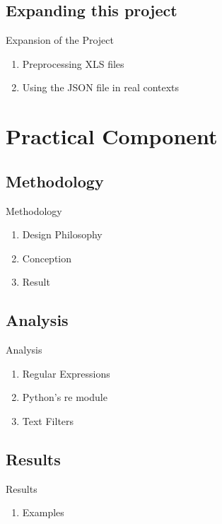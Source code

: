 \documentclass[13.7pt]{beamer}
\begin{document}
\subsection{Expanding this project}
\begin{frame}{Expansion of the Project}
    \begin{enumerate}
        \item{Preprocessing XLS files}
  \pause\item{Using the JSON file in real contexts}
    \end{enumerate}
\end{frame}


\section{Practical Component}
\subsection{Methodology}
\begin{frame}{Methodology}
    \begin{enumerate}
        \item{Design Philosophy}
  \pause\item{Conception}
  \pause\item{Result}
    \end{enumerate}
\end{frame}
\subsection{Analysis}
\begin{frame}{Analysis}
    \begin{enumerate}
        \item{Regular Expressions}
  \pause\item{Python's re module}
  \pause\item{Text Filters}
    \end{enumerate}
\end{frame}
\subsection{Results}
\begin{frame}{Results}
    \begin{enumerate}
        \item{Examples}
    \end{enumerate}
\end{frame}
\end{document}
